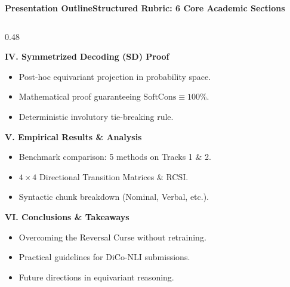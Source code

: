 \documentclass[aspectratio=169,10pt]{beamer}
\begin{document}
\begin{frame}{\textbf{Presentation Outline}}{\textbf{Structured Rubric: 6 Core Academic Sections}}
\begin{columns}[T]
    \begin{column}{0.48\textwidth}
      \begin{block}{\textbf{IV. Symmetrized Decoding (SD) Proof}}
        \small
        \begin{itemize}
          \item Post-hoc equivariant projection in probability space.
          \item Mathematical proof guaranteeing $\text{SoftCons} \equiv 100\%$.
          \item Deterministic involutory tie-breaking rule.
        \end{itemize}
      \end{block}
      \vspace{0.15cm}
      \begin{block}{\textbf{V. Empirical Results \& Analysis}}
        \small
        \begin{itemize}
          \item Benchmark comparison: 5 methods on Tracks 1 \& 2.
          \item $4 \times 4$ Directional Transition Matrices \& RCSI.
          \item Syntactic chunk breakdown (Nominal, Verbal, etc.).
        \end{itemize}
      \end{block}
      \vspace{0.15cm}
      \begin{block}{\textbf{VI. Conclusions \& Takeaways}}
        \small
        \begin{itemize}
          \item Overcoming the Reversal Curse without retraining.
          \item Practical guidelines for DiCo-NLI submissions.
          \item Future directions in equivariant reasoning.
        \end{itemize}
      \end{block}
    \end{column}
  \end{columns}
\end{frame}
\end{document}
